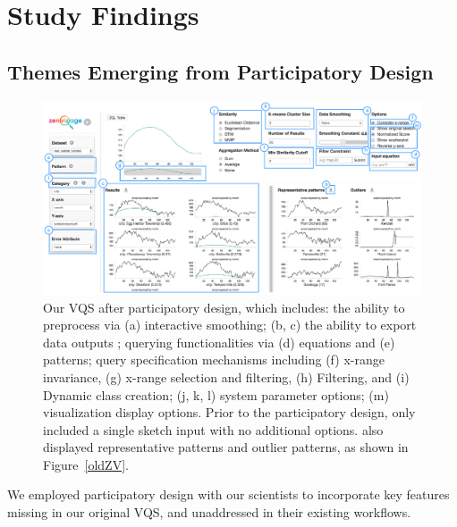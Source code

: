 \section{Study Findings}
\subsection{Themes Emerging from Participatory Design\label{pd_findings}}
\begin{figure}[ht!]
\centering
\vspace{-15pt}
\includegraphics[width=\linewidth]{figures/newZV.pdf} %
\vspace{-5pt}\caption{Our VQS after participatory design, which includes: the ability to preprocess via (a) interactive smoothing; (b, c) the ability to export data outputs ; querying functionalities via (d) equations and (e) patterns; query specification mechanisms including (f) x-range invariance, (g) x-range selection and filtering, (h) Filtering, and (i) Dynamic class creation; (j, k, l) system parameter options; (m) visualization display options. Prior to the participatory design, \zv only included a single sketch input with no additional options. \zv also displayed representative patterns and outlier patterns, as shown in Figure~\ref{oldZV}.}
\label{zvOverview}
\vspace{-14pt}
\end{figure}

\par We employed participatory design with our scientists to incorporate key features missing in our original VQS, and unaddressed in their existing workflows. %
